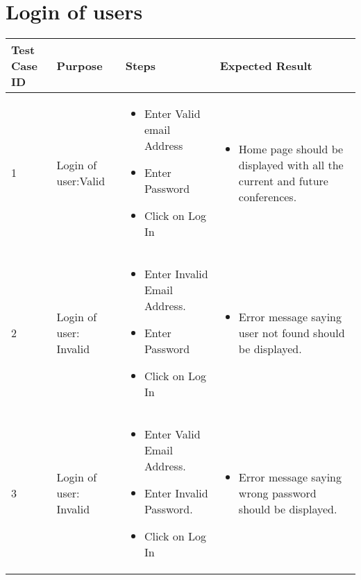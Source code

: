 \documentclass[english,a4paper,12pt]{report}
\begin{document}
\section{Login of users}
\begin{longtable} { | p{2cm} | p{3cm}| p{6cm}| p{6cm} |} 
\hline 
\textbf{Test Case ID} & \textbf{Purpose}  & \textbf{Steps} &\textbf{Expected Result} \\
\hline 1 &  
Login of user:\newline Valid &  
\vspace{-5mm}
\begin{itemize}
\item Enter Valid email Address 
\item Enter Password 
\item Click on Log In
\end{itemize}
& \vspace{-5mm}
\begin{itemize}
\item Home page should be displayed with all the current and future conferences.
\end{itemize}\\
\hline 2 &
Login of user: Invalid &
\vspace{-5mm}
\begin{itemize}
\item Enter Invalid Email Address.
\item Enter Password
\item Click on Log In
\end{itemize}&
\vspace{-5mm}
\begin{itemize}
\item Error message saying user not found should be displayed.
\end{itemize}\\
\hline 3 &  Login of user: Invalid & 
\vspace{-5mm}
\begin{itemize}
\item Enter Valid Email Address.
\item Enter Invalid Password.
\item Click on Log In
\end{itemize}& 
\vspace{-5mm}
\begin{itemize}
\item Error message saying wrong password should be displayed.
\end{itemize} \\ 

\end{longtable}
\end{document}

